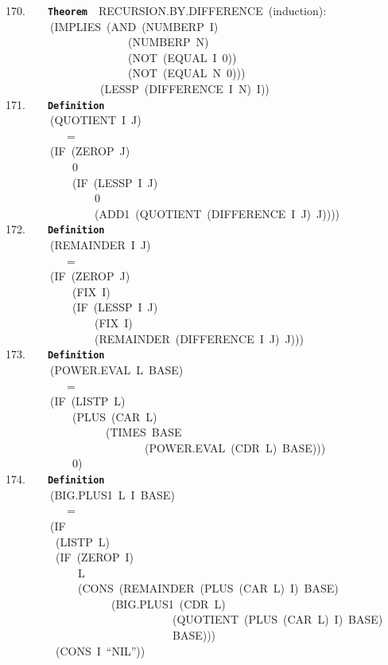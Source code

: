 \documentclass[11pt]{book}
\newenvironment{pubasis}{\begin{flushleft}\ttfamily\small}{\normalsize\rmfamily\end{flushleft}}
\newcommand{\axiomordefinition}[1]{\vspace{6pt}\texttt{\textbf{#1}}}
\begin{document}
\begin{pubasis}
170.~~~~\axiomordefinition{Theorem}~~RECURSION.BY.DIF\-FER\-ENCE~(induction):\\
~~~~~~~~(IMPLIES~(AND~(NUMBERP~I)\\
~~~~~~~~~~~~~~~~~~~~~~(NUMBERP~N)\\
~~~~~~~~~~~~~~~~~~~~~~(NOT~(EQUAL~I~0))\\
~~~~~~~~~~~~~~~~~~~~~~(NOT~(EQUAL~N~0)))\\
~~~~~~~~~~~~~~~~~(LESSP~(DIFFERENCE~I~N)~I))\\

171.~~~~\axiomordefinition{Definition}\\
~~~~~~~~(QUOTIENT~I~J)\\
~~~~~~~~~~~=\\
~~~~~~~~(IF~(ZEROP~J)\\
~~~~~~~~~~~~0\\
~~~~~~~~~~~~(IF~(LESSP~I~J)\\
~~~~~~~~~~~~~~~~0\\
~~~~~~~~~~~~~~~~(ADD1~(QUOTIENT~(DIFFERENCE~I~J)~J))))\\

172.~~~~\axiomordefinition{Definition}\\
~~~~~~~~(REMAINDER~I~J)\\
~~~~~~~~~~~=\\
~~~~~~~~(IF~(ZEROP~J)\\
~~~~~~~~~~~~(FIX~I)\\
~~~~~~~~~~~~(IF~(LESSP~I~J)\\
~~~~~~~~~~~~~~~~(FIX~I)\\
~~~~~~~~~~~~~~~~(REMAINDER~(DIFFERENCE~I~J)~J)))\\

173.~~~~\axiomordefinition{Definition}\\
~~~~~~~~(POWER.EVAL~L~BASE)\\
~~~~~~~~~~~=\\
~~~~~~~~(IF~(LISTP~L)\\
~~~~~~~~~~~~(PLUS~(CAR~L)\\
~~~~~~~~~~~~~~~~~~(TIMES~BASE\\
~~~~~~~~~~~~~~~~~~~~~~~~~(POWER.EVAL~(CDR~L)~BASE)))\\
~~~~~~~~~~~~0)\\

174.~~~~\axiomordefinition{Definition}\\
~~~~~~~~(BIG.PLUS1~L~I~BASE)\\
~~~~~~~~~~~=\\
~~~~~~~~(IF\\
~~~~~~~~~(LISTP~L)\\
~~~~~~~~~(IF~(ZEROP~I)\\
~~~~~~~~~~~~~L\\
~~~~~~~~~~~~~(CONS~(REMAINDER~(PLUS~(CAR~L)~I)~BASE)\\
~~~~~~~~~~~~~~~~~~~(BIG.PLUS1~(CDR~L)\\
~~~~~~~~~~~~~~~~~~~~~~~~~~~~~~(QUOTIENT~(PLUS~(CAR~L)~I)~BASE)\\
~~~~~~~~~~~~~~~~~~~~~~~~~~~~~~BASE)))\\
~~~~~~~~~(CONS~I~``NIL''))\\


\end{pubasis}
\end{document}
